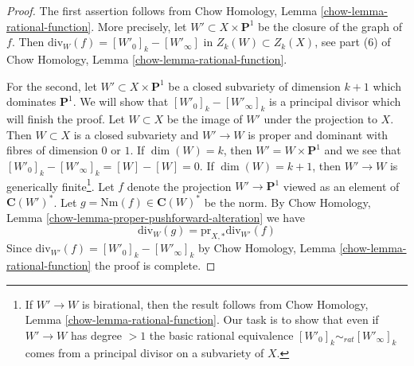 \documentclass[10pt,a4paper]{amsart}
\theoremstyle{plain}
\theoremstyle{definition}
\theoremstyle{remark}
\numberwithin{equation}{subsection}
\begin{document}
\begin{proof}
The first assertion follows from
Chow Homology, Lemma \ref{chow-lemma-rational-function}.
More precisely, let $W' \subset X \times \mathbf{P}^1$ be the closure
of the graph of $f$. Then $\text{div}_W(f) = [W'_0]_k - [W'_\infty]$
in $Z_k(W) \subset Z_k(X)$, see part (6) of
Chow Homology, Lemma \ref{chow-lemma-rational-function}.

\medskip\noindent
For the second, let $W' \subset X \times \mathbf{P}^1$ be a closed
subvariety of dimension $k + 1$ which dominates $\mathbf{P}^1$.
We will show that $[W'_0]_k - [W'_\infty]_k$ is a principal divisor
which will finish the proof. Let $W \subset X$ be the image of $W'$
under the projection to $X$. Then $W \subset X$ is a closed subvariety
and $W' \to W$ is proper and dominant with fibres of dimension $0$
or $1$. If $\dim(W) = k$, then $W' = W \times \mathbf{P}^1$ and we
see that $[W'_0]_k - [W'_\infty]_k = [W] - [W] = 0$.
If $\dim(W) = k + 1$, then
$W' \to W$ is generically finite\footnote{If $W' \to W$ is birational,
then the result follows from
Chow Homology, Lemma \ref{chow-lemma-rational-function}.
Our task is to show that even if $W' \to W$
has degree $> 1$ the basic rational equivalence
$[W'_0]_k \sim_{rat} [W'_\infty]_k$ comes from a principal divisor
on a subvariety of $X$.}. Let $f$ denote the projection $W' \to \mathbf{P}^1$
viewed as an element of $\mathbf{C}(W')^*$. Let
$g = \text{Nm}(f) \in \mathbf{C}(W)^*$ be the norm. By
Chow Homology, Lemma \ref{chow-lemma-proper-pushforward-alteration}
we have
$$
\text{div}_W(g) = \text{pr}_{X, *}\text{div}_{W'}(f)
$$
Since $\text{div}_{W'}(f) = [W'_0]_k - [W'_\infty]_k$ 
by Chow Homology, Lemma \ref{chow-lemma-rational-function}
the proof is complete.
\end{proof}
\end{document}
